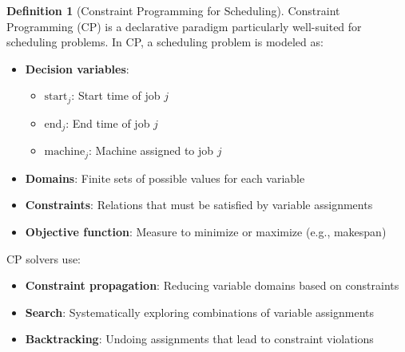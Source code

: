\documentclass{article}
\theoremstyle{definition}
\newtheorem{definition}{Definition}
\begin{document}
\begin{definition}[Constraint Programming for Scheduling]
Constraint Programming (CP) is a declarative paradigm particularly well-suited for scheduling problems. In CP, a scheduling problem is modeled as:
\begin{itemize}
    \item \textbf{Decision variables}: 
    \begin{itemize}
        \item $\text{start}_j$: Start time of job $j$
        \item $\text{end}_j$: End time of job $j$
        \item $\text{machine}_j$: Machine assigned to job $j$
    \end{itemize}
    \item \textbf{Domains}: Finite sets of possible values for each variable
    \item \textbf{Constraints}: Relations that must be satisfied by variable assignments
    \item \textbf{Objective function}: Measure to minimize or maximize (e.g., makespan)
\end{itemize}

CP solvers use:
\begin{itemize}
    \item \textbf{Constraint propagation}: Reducing variable domains based on constraints
    \item \textbf{Search}: Systematically exploring combinations of variable assignments
    \item \textbf{Backtracking}: Undoing assignments that lead to constraint violations
\end{itemize}
\end{definition}
\end{document}
